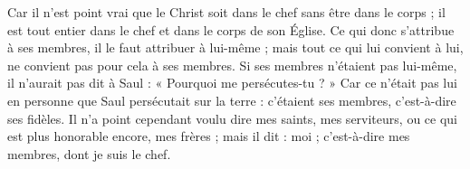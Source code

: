  Car il n’est point vrai que le Christ soit dans le chef sans être dans le corps ; il est tout entier dans le chef et dans le corps de son Église. Ce qui donc s’attribue à ses membres, il le faut attribuer à lui-même ; mais tout ce qui lui convient à lui, ne convient pas pour cela à ses membres. Si ses membres n’étaient pas lui-même, il n’aurait pas dit à Saul : « Pourquoi me persécutes-tu ? » Car ce n’était pas lui en personne que Saul persécutait sur la terre : c’étaient ses membres, c’est-à-dire ses fidèles. Il n’a point cependant voulu dire mes saints, mes serviteurs, ou ce qui est plus honorable encore, mes frères ; mais il dit : moi ; c’est-à-dire mes membres, dont je suis le chef.